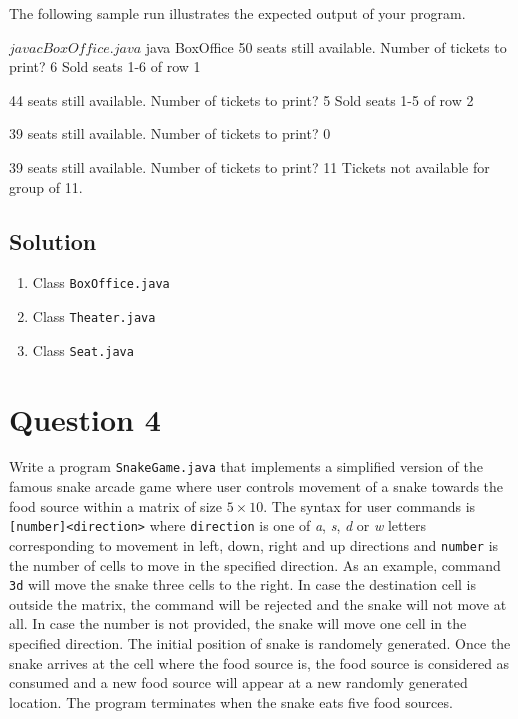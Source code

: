 \documentclass[12pt,letterpaper,twoside]{article}
\begin{document}
The following sample run illustrates the expected output of your program.

\begin{terminal}
$ javac BoxOffice.java
$ java BoxOffice
50 seats still available.
Number of tickets to print? 6
Sold seats 1-6 of row 1

44 seats still available.
Number of tickets to print? 5
Sold seats 1-5 of row 2

39 seats still available.
Number of tickets to print? 0

39 seats still available.
Number of tickets to print? 11
Tickets not available for group of 11.
\end{terminal}

\subsection*{Solution}

\lstset{language=java}
\begin{enumerate}
	\item Class \texttt{BoxOffice.java}
	
	\item Class \texttt{Theater.java}
	
	\item Class \texttt{Seat.java}
	
\end{enumerate}

\section*{Question 4}

Write a program \texttt{SnakeGame.java} that implements a simplified version of the famous snake arcade game where user controls movement of a snake towards the food source within a matrix of size $5 \times 10$.
The syntax for user commands is \texttt{[number]<direction>} where \texttt{direction} is one of \textit{a}, \textit{s}, \textit{d} or \textit{w} letters corresponding to movement in left, down, right and up directions and \texttt{number} is the number of cells to move in the specified direction. As an example, command \texttt{3d} will move the snake three cells to the right.
In case the destination cell is outside the matrix, the command will be rejected and the snake will not move at all.
In case the number is not provided, the snake will move one cell in the specified direction.
The initial position of snake is randomely generated.
Once the snake arrives at the cell where the food source is, the food source is considered as consumed and a new food source will appear at a new randomly generated location.
The program terminates when the snake eats five food sources.
\end{document}

